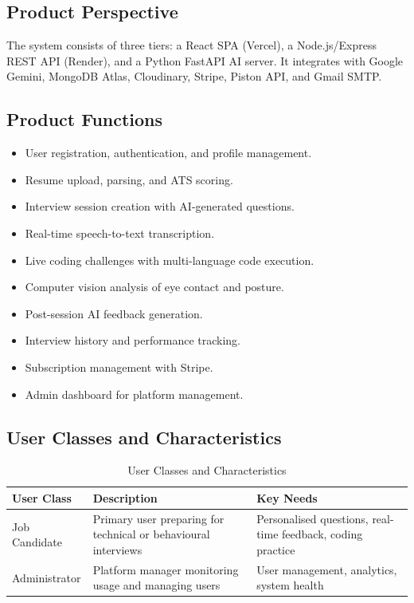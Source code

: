 \subsection*{Product Perspective}
The system consists of three tiers: a React SPA (Vercel), a Node.js/Express REST API (Render), and a Python FastAPI AI server. It integrates with Google Gemini, MongoDB Atlas, Cloudinary, Stripe, Piston API, and Gmail SMTP.

\subsection*{Product Functions}
\begin{itemize}
  \item User registration, authentication, and profile management.
  \item Resume upload, parsing, and ATS scoring.
  \item Interview session creation with AI-generated questions.
  \item Real-time speech-to-text transcription.
  \item Live coding challenges with multi-language code execution.
  \item Computer vision analysis of eye contact and posture.
  \item Post-session AI feedback generation.
  \item Interview history and performance tracking.
  \item Subscription management with Stripe.
  \item Admin dashboard for platform management.
\end{itemize}

\subsection*{User Classes and Characteristics}

\begin{table}[H]
\centering
\caption{User Classes and Characteristics}
\vspace{6pt}
\begin{tabularx}{\textwidth}{|L{2.8cm}|X|X|}
\hline
\textbf{User Class} & \textbf{Description} & \textbf{Key Needs} \\
\hline
Job Candidate & Primary user preparing for technical or behavioural interviews & Personalised questions, real-time feedback, coding practice \\
\hline
Administrator & Platform manager monitoring usage and managing users & User management, analytics, system health \\
\hline
\end{tabularx}
\label{tab:userclasses}
\end{table}

